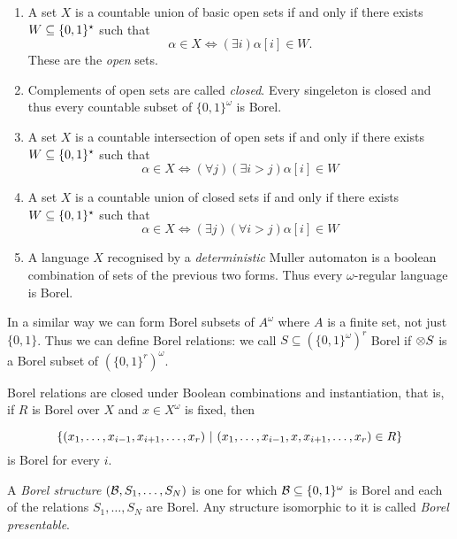 \begin{example}
\begin{enumerate}
 \item A set $X$ is a  countable union of basic open sets if and only if there exists $W \subseteq \{0,1\}^\star$ such that
\[
 \alpha \in X \iff (\exists i) \alpha[i] \in W.
\]
These are the {\em open} sets. 

\item Complements of open sets are called {\em closed}.  Every singeleton is closed and thus
every countable subset of $\{0,1\}^\omega$ is Borel.

\item A set $X$ is a countable intersection of open sets if and only if there exists $W \subseteq \{0,1\}^\star$ such that
\[
\alpha \in X \iff (\forall j) (\exists i > j)\alpha[i] \in W
\]

\item A set $X$ is a countable union of closed sets if and only if there exists $W \subseteq \{0,1\}^\star$ such that
\[
\alpha \in X \iff (\exists j) (\forall i > j) \alpha[i] \in W
\]
 
\item A language $X$ recognised by a {\em deterministic} Muller automaton is a boolean combination of sets of the previous two forms. Thus 
every $\omega$-regular language is Borel.
\end{enumerate}
\end{example}

In a similar way we can form Borel subsets of $A^\omega$ where $A$ is a finite set, not just $\{0,1\}$.
Thus we can define Borel relations: we call $S \subseteq (\{0,1\}^\omega)^r$ Borel if $\otimes S$ is a Borel subset of $(\{0,1\}^r)^\omega$.

\begin{lemma} \label{AS:lem:Borelclosure}
Borel relations are closed under Boolean combinations and instantiation, that is, if $R$ is Borel over $X$ and $x \in X^\omega$ is fixed, then

\[
\{(x_1,\dots,x_{i-1},x_{i+1},\dots,x_r) \ \vert \  (x_1,\dots,x_{i-1},x,x_{i+1},\dots,x_r) \in R\}
\]
 is Borel for every $i$.
\end{lemma}

\begin{definition} \label{AS:dfn:bap}
A {\em Borel structure} $({\mathcal B},S_1,\dots,S_N)$ is one for which ${\mathcal B} \subseteq \{0,1\}^\omega$ is Borel 
and each of the relations $S_1,\dots, S_N$ are Borel. Any structure isomorphic to it is called {\em Borel presentable}.
\end{definition}

